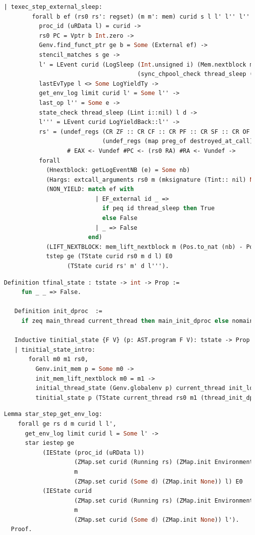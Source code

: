 \begin{lstlisting}[language=Caml]
    | texec_step_external_sleep:
        forall b ef (rs0 rs': regset) (m m': mem) curid s l l' l'' l''' nb d e i,
          proc_id (uRData l) = curid ->
          rs0 PC = Vptr b Int.zero ->
          Genv.find_funct_ptr ge b = Some (External ef) ->
          stencil_matches s ge ->
          l' = LEvent curid (LogSleep (Int.unsigned i) (Mem.nextblock m)
                                      (sync_chpool_check thread_sleep ((Lint i)::nil) (uRData l) d))::l ->
          lastEvType l <> Some LogYieldTy ->
          get_env_log limit curid l' = Some l'' ->
          last_op l'' = Some e ->
          state_check thread_sleep (Lint i::nil) l d ->
          l''' = LEvent curid LogYieldBack::l'' ->
          rs' = (undef_regs (CR ZF :: CR CF :: CR PF :: CR SF :: CR OF :: nil)
                            (undef_regs (map preg_of destroyed_at_call) rs0)) 
                  # EAX <- Vundef #PC <- (rs0 RA) #RA <- Vundef ->
          forall
            (Hnextblock: getLogEventNB (e) = Some nb)
            (Hargs: extcall_arguments rs0 m (mksignature (Tint:: nil) None cc_default) (Vint i:: nil))
            (NON_YIELD: match ef with
                          | EF_external id _ => 
                            if peq id thread_sleep then True
                            else False
                          | _ => False
                        end)
            (LIFT_NEXTBLOCK: mem_lift_nextblock m (Pos.to_nat (nb) - Pos.to_nat (Mem.nextblock m) % nat) = m'),
            tstep ge (TState curid rs0 m d l) E0
                  (TState curid rs' m' d l''').
\end{lstlisting}

\begin{lstlisting}[language=Caml]
   Definition tfinal_state : tstate -> int -> Prop :=
     fun _ _ => False.
   
   Definition init_dproc  :=
     if zeq main_thread current_thread then main_init_dproc else nomain_init_dproc.

   Inductive tinitial_state {F V} (p: AST.program F V): tstate -> Prop :=
   | tinitial_state_intro: 
       forall m0 m1 rs0,
         Genv.init_mem p = Some m0 ->
         init_mem_lift_nextblock m0 = m1 ->
         initial_thread_state (Genv.globalenv p) current_thread init_log = Some rs0 ->
         tinitial_state p (TState current_thread rs0 m1 (thread_init_dproc current_thread) init_log).
\end{lstlisting}

\begin{lstlisting}[language=Caml]
  Lemma star_step_get_env_log:
    forall ge rs d m curid l l',
      get_env_log limit curid l = Some l' ->
      star iestep ge
           (IEState (proc_id (uRData l))
                    (ZMap.set curid (Running rs) (ZMap.init Environment))
                    m
                    (ZMap.set curid (Some d) (ZMap.init None)) l) E0
           (IEState curid
                    (ZMap.set curid (Running rs) (ZMap.init Environment))
                    m
                    (ZMap.set curid (Some d) (ZMap.init None)) l').
  Proof.
\end{lstlisting}

